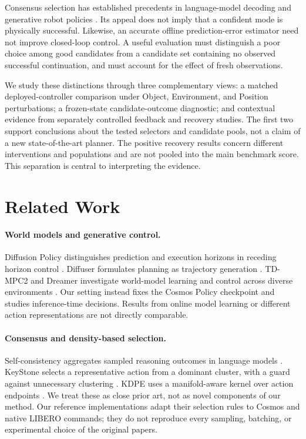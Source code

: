 \documentclass{article}
\begin{document}
Consensus selection has established precedents in language-model decoding
\citep{self_consistency} and generative robot policies \citep{keystone,kdpe}.
Its appeal does not imply that a confident mode is physically successful.
Likewise, an accurate offline prediction-error estimator need not improve
closed-loop control. A useful evaluation must distinguish a poor choice
among good candidates from a candidate set containing no observed successful
continuation, and must account for the effect of fresh observations.

We study these distinctions through three complementary views: a matched
deployed-controller comparison under Object, Environment, and Position
perturbations; a frozen-state candidate-outcome diagnostic; and contextual
evidence from separately controlled feedback and recovery studies. The first
two support conclusions about the tested selectors and candidate pools, not a
claim of a new state-of-the-art planner. The positive recovery results concern
different interventions and populations and are not pooled into the main
benchmark score. This separation is central to interpreting the evidence.

\section{Related Work}
\paragraph{World models and generative control.}
Diffusion Policy distinguishes prediction and execution horizons in receding
horizon control \citep{diffusion_policy}. Diffuser formulates planning as
trajectory generation \citep{diffuser}. TD-MPC2 and Dreamer investigate
world-model learning and control across diverse environments
\citep{tdmpc2,dreamerv3}. Our setting instead fixes the Cosmos Policy
checkpoint and studies inference-time decisions. Results from online model
learning or different action representations are not directly comparable.

\paragraph{Consensus and density-based selection.}
Self-consistency aggregates sampled reasoning outcomes in language models
\citep{self_consistency}. KeyStone selects a representative action from a
dominant cluster, with a guard against unnecessary clustering
\citep{keystone}. KDPE uses a manifold-aware kernel over action endpoints
\citep{kdpe}. We treat these as close prior art, not as novel components of
our method. Our reference implementations adapt their selection rules to
Cosmos and native LIBERO commands; they do not reproduce every sampling,
batching, or experimental choice of the original papers.
\end{document}
